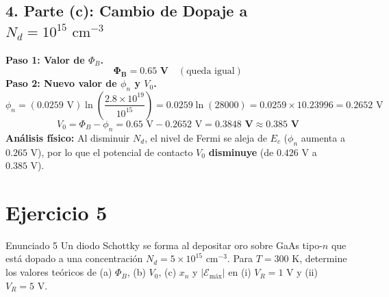 \documentclass[11pt,a4paper]{article}
\begin{document}
\subsection*{4. Parte (c): Cambio de Dopaje a $N_d = 10^{15}\text{ cm}^{-3}$}
\textbf{Paso 1: Valor de $\Phi_B$.}
\[
\mathbf{\Phi_B = 0.65\text{ V}} \quad (\text{queda igual})
\]
\textbf{Paso 2: Nuevo valor de $\phi_n$ y $V_0$.}
\[
\phi_n = (0.0259\text{ V}) \ln\left(\frac{2.8 \times 10^{19}}{10^{15}}\right) = 0.0259 \ln(28000) = 0.0259 \times 10.23996 = 0.2652\text{ V}
\]
\[
V_0 = \Phi_B - \phi_n = 0.65\text{ V} - 0.2652\text{ V} = \mathbf{0.3848\text{ V} \approx 0.385\text{ V}}
\]
\textbf{Análisis físico:} Al disminuir $N_d$, el nivel de Fermi se aleja de $E_c$ ($\phi_n$ aumenta a $0.265\text{ V}$), por lo que el potencial de contacto $V_0$ \textbf{disminuye} (de $0.426\text{ V}$ a $0.385\text{ V}$).

\begin{respuestabox}
\begin{center}
%
\end{center}
\end{respuestabox}

\newpage

\section*{Ejercicio 5}
\begin{ejerciciobox}{Enunciado 5}
Un diodo Schottky se forma al depositar oro sobre GaAs tipo-$n$ que está dopado a una concentración $N_d = 5 \times 10^{15}\text{ cm}^{-3}$. Para $T = 300\text{ K}$, determine los valores teóricos de (a) $\Phi_B$, (b) $V_0$, (c) $x_n$ y $|\mathcal{E}_{\text{máx}}|$ en (i) $V_R = 1\text{ V}$ y (ii) $V_R = 5\text{ V}$.
\end{ejerciciobox}
\end{document}
